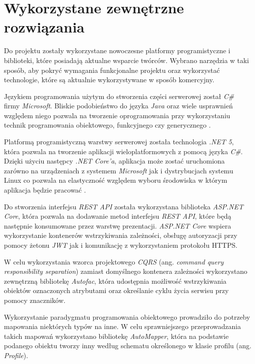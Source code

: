 \documentclass[a4paper,twoside,12pt]{book}
\newcommand{\obcy}[1]{\emph{#1}}
\newcommand{\ang}[1]{{\selectlanguage{british}\obcy{#1}}}
\begin{document}
	\section{Wykorzystane zewnętrzne rozwiązania}
	Do projektu zostały wykorzystane nowoczesne platformy programistyczne i biblioteki, które posiadają aktualne wsparcie twórców. Wybrano narzędzia w taki sposób, aby pokryć wymagania funkcjonalne projektu oraz wykorzystać technologie, które są aktualnie wykorzystywane w sposób komercyjny.
	
	Językiem programowania użytym do stworzenia części serwerowej został \textit{C\#} firmy \textit{Microsoft}. Bliskie podobieństwo do języka \textit{Java} oraz wiele usprawnień względem niego pozwala na tworzenie oprogramowania przy wykorzystaniu technik programowania obiektowego, funkcyjnego czy generycznego \cite{bib:csharp}.
	
	Platformą programistyczną warstwy serwerowej została technologia \textit{.NET 5}, która pozwala na tworzenie aplikacji wieloplatformowych z pomocą języka \textit{C\#}. Dzięki użyciu następcy \textit{.NET Core'a}, aplikacja może zostać uruchomiona zarówno na urządzeniach z systemem \textit{Microsoft} jak i dystrybucjach systemu Linux co pozwala na elastyczność względem wyboru środowiska w którym aplikacja będzie pracować \cite{bib:dotnet5introduction}.
	
	Do stworzenia interfejsu \textit{REST API} została wykorzystana biblioteka \textit{ASP.NET Core}, która pozwala na dodawanie metod interfejsu \textit{REST API}, które będą następnie konsumowane przez warstwę prezentacji. \textit{ASP.NET Core} wspiera wykorzystanie kontenerów wstrzykiwania zależności, obsługę autoryzacji przy pomocy żetonu \textit{JWT} jak i komunikację z wykorzystaniem protokołu HTTPS\cite{bib:asp}.
	
	W celu wykorzystania wzorca projektowego \textit{CQRS} (ang. \ang{command query responsibility separation}) zamiast domyślnego kontenera zależności wykorzystano zewnętrzną bibliotekę \textit{Autofac}, która udostępnia możliwość wstrzykiwania obiektów oznaczonych atrybutami oraz określanie cyklu życia serwisu przy pomocy znaczników\cite{bib:autofactag}.
	
	Wykorzystanie paradygmatu programowania obiektowego prowadziło do potrzeby mapowania niektórych typów na inne. W celu sprawniejszego przeprowadzania takich mapowań wykorzystano bibliotekę \textit{AutoMapper}, która na podstawie podanego obiektu tworzy inny według schematu określonego w klasie profilu (ang. \ang{Profile}).
	
\end{document}
